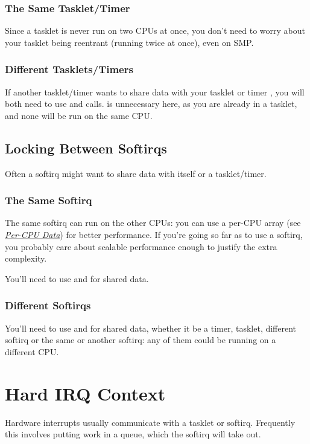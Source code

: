 \documentclass[a4paper,8pt,english]{sphinxmanual}
\begin{document}
\subsubsection{The Same Tasklet/Timer}
\label{kernel-hacking/locking:the-same-tasklet-timer}
Since a tasklet is never run on two CPUs at once, you don't need to
worry about your tasklet being reentrant (running twice at once), even
on SMP.


\subsubsection{Different Tasklets/Timers}
\label{kernel-hacking/locking:different-tasklets-timers}
If another tasklet/timer wants to share data with your tasklet or timer
, you will both need to use  and
 calls.  is
unnecessary here, as you are already in a tasklet, and none will be run
on the same CPU.


\subsection{Locking Between Softirqs}
\label{kernel-hacking/locking:locking-between-softirqs}
Often a softirq might want to share data with itself or a tasklet/timer.


\subsubsection{The Same Softirq}
\label{kernel-hacking/locking:the-same-softirq}
The same softirq can run on the other CPUs: you can use a per-CPU array
(see {\hyperref[kernel\string-hacking/locking:per\string-cpu]{\emph{Per-CPU Data}}}) for better performance. If you're
going so far as to use a softirq, you probably care about scalable
performance enough to justify the extra complexity.

You'll need to use  and
 for shared data.


\subsubsection{Different Softirqs}
\label{kernel-hacking/locking:different-softirqs}
You'll need to use  and
 for shared data, whether it be a timer,
tasklet, different softirq or the same or another softirq: any of them
could be running on a different CPU.


\section{Hard IRQ Context}
\label{kernel-hacking/locking:hard-irq-context}
Hardware interrupts usually communicate with a tasklet or softirq.
Frequently this involves putting work in a queue, which the softirq will
take out.
\end{document}
